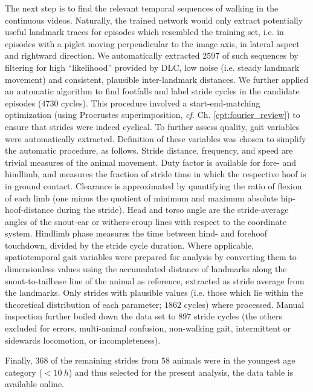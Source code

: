 The next step is to find the relevant temporal sequences of walking in the continuous videos.
Naturally, the trained network would only extract potentially useful landmark traces for episodes which resembled the training set, i.e. in episodes with a piglet moving perpendicular to the image axis, in lateral aspect and rightward direction.
We automatically extracted \(2597\) of such sequences by filtering for high  ``likelihood'' provided by DLC, low noise (i.e. steady landmark movement) and consistent, plausible inter-landmark distances.
We further applied an automatic algorithm to find footfalls and label stride cycles in the candidate episodes (\(4730\) cycles).
This procedure involved a start-end-matching optimization (using Procrustes superimposition, \textit{cf.} Ch. \ref{cpt:fourier_review}) to ensure that strides were indeed cyclical.
To further assess  quality, gait variables were automatically extracted.
Definition of these variables was chosen to simplify the automatic procedure, as follows.
Stride distance, frequency, and speed are trivial measures of the animal movement.
Duty factor is available for fore- and hindlimb, and measures the fraction of stride time in which the respective hoof is in ground contact.
Clearance is approximated by quantifying the ratio of flexion of each limb (one minus the quotient of minimum and maximum absolute hip-hoof-distance during the stride).
Head and torso angle are the stride-average angles of the snout-ear or withers-croup lines with respect to the coordinate system.
Hindlimb phase measures the time between hind- and forehoof touchdown, divided by the stride cycle duration.
Where applicable, spatiotemporal gait variables were prepared for analysis by converting them to dimensionless values \citep{Hof1996,Alexander1983} using the accumulated distance of landmarks along the snout-to-tailbase line of the animal as reference, extracted as stride average from the  landmarks.
Only strides with plausible values (i.e. those which lie within the theoretical distribution of each parameter; \(1862\) cycles) where processed.
Manual inspection further boiled down the data set to 897 stride cycles (the others excluded for  errors, multi-animal confusion, non-walking gait, intermittent or sidewards locomotion, or incompleteness).

Finally, \(368\) of the remaining strides from \(58\) animals were in the youngest age category (\(<10\ h\)) and thus selected for the present analysis, the data table is available online.


